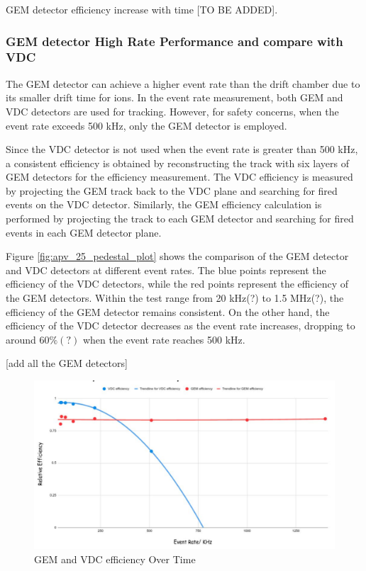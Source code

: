GEM detector efficiency increase with time [TO BE ADDED]. 

\subsubsection{GEM detector High Rate Performance and compare with VDC}

The GEM detector can achieve a higher event rate than the drift chamber due to its smaller drift time for ions. In the event rate measurement, both GEM and VDC detectors are used for tracking. However, for safety concerns, when the event rate exceeds 500 kHz, only the GEM detector is employed.

Since the VDC detector is not used when the event rate is greater than 500 kHz, a consistent efficiency is obtained by reconstructing the track with six layers of GEM detectors for the efficiency measurement. The VDC efficiency is measured by projecting the GEM track back to the VDC plane and searching for fired events on the VDC detector. Similarly, the GEM efficiency calculation is performed by projecting the track to each GEM detector and searching for fired events in each GEM detector plane.

Figure \ref{fig:apv_25_pedestal_plot} shows the comparison of the GEM detector and VDC detectors at different event rates. The blue points represent the efficiency of the VDC detectors, while the red points represent the efficiency of the GEM detectors. Within the test range from 20 kHz(?) to 1.5 MHz(?), the efficiency of the GEM detector remains consistent. On the other hand, the efficiency of the VDC detector decreases as the event rate increases, dropping to around $60\%(?)$ when the event rate reaches 500 kHz. 

[add all the GEM detectors]



\begin{figure}[!htbp]
    \centering
    \includegraphics[width=\textwidth]{images/chap5/gem efficiency over time.png}
    \caption{GEM and VDC efficiency Over Time}
    \label{fig:gem_efficiency_over_time}
\end{figure}